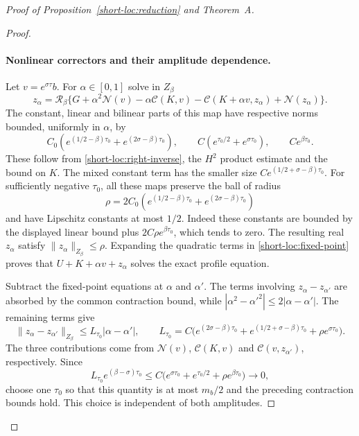 \begin{proof}[Proof of Proposition~\ref{short-loc:reduction} and Theorem~A]
\begin{proof}
\paragraph{Nonlinear correctors and their amplitude dependence.}
Let $v=e^{\sigma\tau}b$. For $\alpha\in[0,1]$ solve in $Z_\beta$
\begin{equation}\label{short-loc:fixed-point}
 z_\alpha=\mathcal R_\beta\{G+\alpha^2\mathcal N(v)
       -\alpha\mathcal C(K,v)
       -\mathcal C(K+\alpha v,z_\alpha)+\mathcal N(z_\alpha)\}.
\end{equation}
The constant, linear and bilinear parts of this map have respective
norms bounded, uniformly in $\alpha$, by
\[
 C_0(e^{(1/2-\beta)\tau_0}+e^{(2\sigma-\beta)\tau_0}),\qquad
 C(e^{\tau_0/2}+e^{\sigma\tau_0}),\qquad Ce^{\beta\tau_0}.
\]
These follow from \eqref{short-loc:right-inverse}, the $H^2$ product
estimate and the bound on $K$. The mixed constant term has the smaller
size $Ce^{(1/2+\sigma-\beta)\tau_0}$. For sufficiently negative
$\tau_0$, all these maps preserve the ball of radius
\[
 \rho=2C_0(e^{(1/2-\beta)\tau_0}+e^{(2\sigma-\beta)\tau_0})
\]
and have Lipschitz constants at most $1/2$. Indeed these constants are
bounded by the displayed linear bound plus $2C\rho e^{\beta\tau_0}$,
which tends to zero. The resulting real $z_\alpha$ satisfy
$\|z_\alpha\|_{Z_\beta}\le\rho$.
Expanding the quadratic terms in \eqref{short-loc:fixed-point} proves
that $U+K+\alpha v+z_\alpha$ solves the exact profile equation.

Subtract the fixed-point equations at $\alpha$ and $\alpha'$.
The terms involving $z_\alpha-z_{\alpha'}$ are absorbed by the
common contraction bound, while $|\alpha^2-\alpha'^2|\le2|\alpha-\alpha'|$.
The remaining terms give
\begin{equation}\label{short-loc:amplitude}
 \|z_\alpha-z_{\alpha'}\|_{Z_\beta}
 \le L_{\tau_0}|\alpha-\alpha'|,\qquad
 L_{\tau_0}=C\bigl(e^{(2\sigma-\beta)\tau_0}
       +e^{(1/2+\sigma-\beta)\tau_0}+\rho e^{\sigma\tau_0}\bigr).
\end{equation}
The three contributions come from $\mathcal N(v)$,
$\mathcal C(K,v)$ and $\mathcal C(v,z_{\alpha'})$, respectively.
Since
\[
 L_{\tau_0}e^{(\beta-\sigma)\tau_0}
 \le C\bigl(e^{\sigma\tau_0}+e^{\tau_0/2}
                    +\rho e^{\beta\tau_0}\bigr)\longrightarrow0,
\]
choose one $\tau_0$ so that this quantity is at most $m_b/2$ and
the preceding contraction bounds hold. This choice is independent
of both amplitudes.


\end{proof}
\end{proof}
